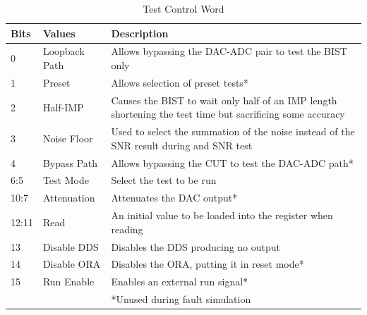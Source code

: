 \documentclass[12pt]{report}
\begin{document}
\begin{table}
	\begin{center}
		\begin{tabular}{|l|l|p{4.3in}|}
			\hline
			Bits & Values & Description \\ \hline
			0 & Loopback Path & Allows bypassing the DAC-ADC pair to test the BIST only \\ \hline
			1 & Preset & Allows selection of preset tests* \\ \hline
			2 & Half-IMP & Causes the BIST to wait only half of an IMP length shortening the test time but sacrificing some accuracy \\ \hline
			3 & Noise Floor & Used to select the summation of the noise instead of the SNR result during and SNR test \\ \hline
			4 & Bypass Path & Allows bypassing the CUT to test the DAC-ADC path* \\ \hline		
			6:5 & Test Mode & Select the test to be run \\ \hline
			10:7 & Attenuation & Attenuates the DAC output* \\ \hline
			12:11 & Read & An initial value to be loaded into the register when reading \\ \hline
			13 & Disable DDS & Disables the DDS producing no output \\ \hline
			14 & Disable ORA & Disables the ORA, putting it in reset mode* \\ \hline
			15 & Run Enable & Enables an external run signal* \\ \hline
			& & *Unused during fault simulation \\ \hline
		\end{tabular}
	\end{center}
	\caption{Test Control Word}
	\label{tbl:TestControlWord}
\end{table}
\end{document}
